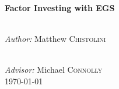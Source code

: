 \begin{titlepage}
\HRule \\[0.4cm]
{ \huge \bfseries Factor Investing with EGS}\\[0.4cm] %
\HRule \\[1.5cm]
 

\begin{minipage}{0.4\textwidth}
\begin{flushleft} \large
\emph{Author:}
Matthew \textsc{Chistolini}\\ %
\end{flushleft}

\end{minipage}\\[1cm]

\Large \emph{Advisor:}
Michael \textsc{Connolly}\\[2cm] %


{\large \today}\\[2cm] %

\vfill %

\end{titlepage}


